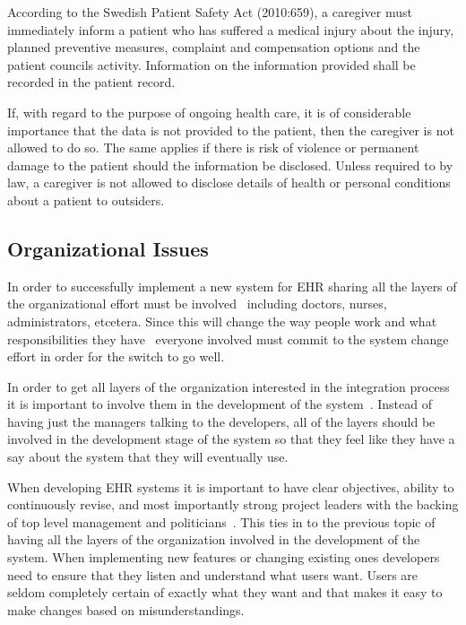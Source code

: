 \documentclass[14pt]{article}
\begin{document}
According to the Swedish Patient Safety Act (2010:659), a caregiver must immediately inform a patient who has suffered a medical injury about the injury, planned preventive measures, complaint and compensation
options and the patient councils activity. Information on the information provided shall be recorded in the patient record.\cite{PatientSafetyAct}

If, with regard to the purpose of ongoing health care, it is of considerable importance that the data is not provided to the patient, then the caregiver is not allowed to do so. The same applies if there is risk of violence or permanent damage to the patient should the information be disclosed. Unless required to by law, a caregiver is not allowed to disclose details of health or personal conditions about a patient to outsiders.\cite{PatientSafetyAct}

\subsection{Organizational Issues}
In order to successfully implement a new system for \gls{EHR} sharing all the layers of the organizational effort must be involved~\cite{Empirica} including doctors, nurses, administrators, etcetera. Since this will change the way people work and what responsibilities they have~\cite{Empirica} everyone involved must commit to the system change effort in order for the switch to go well.

In order to get all layers of the organization interested in the integration process it is important to involve them in the development of the system~\cite{Empirica}. Instead of having just the managers talking to the developers, all of the layers should be involved in the development stage of the system so that they feel like they have a say about the system that they will eventually use.

When developing \gls{EHR} systems it is important to have clear objectives, ability to continuously revise, and most importantly strong project leaders with the backing of top level management and politicians~\cite{Empirica}. This ties in to the previous topic of having all the layers of the organization involved in the development of the system. When implementing new features or changing existing ones developers need to ensure that they listen and understand what users want. Users are seldom completely certain of exactly what they want and that makes it easy to make changes based on misunderstandings.
\end{document}
